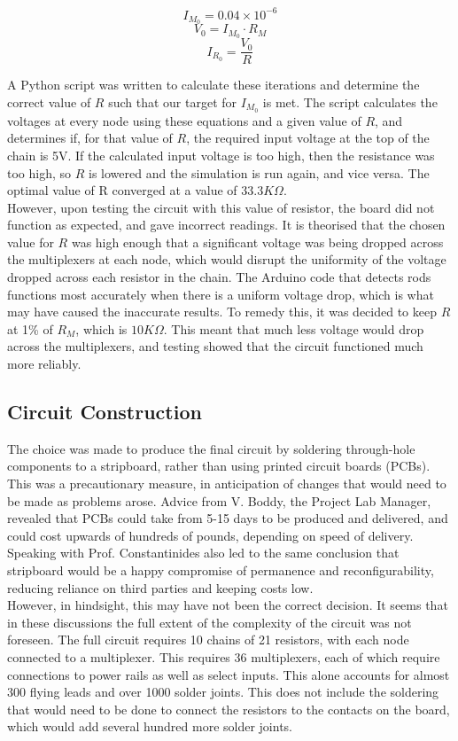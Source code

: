 $$ I_{M_0} = 0.04 \times 10^{-6}$$
$$ V_0 =  I_{M_0} \cdot R_M $$
$$ I_{R_0} = \frac{V_0}{R}$$

A Python script was written to calculate these iterations and determine the correct value of $R$ such that our target for  $I_{M_0}$ is met. The script calculates the voltages at every node using these equations and a given value of $R$, and determines if, for that value of $R$, the required input voltage at the top of the chain is 5V. If the calculated input voltage is too high, then the resistance was too high, so $R$ is lowered and the simulation is run again, and vice versa. The optimal value of R converged at a value of $33.3K\Omega$. \\

However, upon testing the circuit with this value of resistor, the board did not function as expected, and gave incorrect readings. It is theorised that the chosen value for $R$ was high enough that a significant voltage was being dropped across the multiplexers at each node, which would disrupt the uniformity of the voltage dropped across each resistor in the chain. The Arduino code that detects rods functions most accurately when there is a uniform voltage drop, which is what may have caused the inaccurate results. To remedy this, it was decided to keep $R$ at 1\% of $R_M$, which is $10K\Omega$. This meant that much less voltage would drop across the multiplexers, and testing showed that the circuit functioned much more reliably.\\

\subsection{Circuit Construction}

The choice was made to produce the final circuit by soldering through-hole components to a stripboard, rather than using printed circuit boards (PCBs). This was a precautionary measure, in anticipation of changes that would need to be made as problems arose. Advice from V. Boddy, the Project Lab Manager, revealed that PCBs could take from 5-15 days to be produced and delivered, and could cost upwards of hundreds of pounds, depending on speed of delivery. Speaking with Prof. Constantinides also led to the same conclusion that stripboard would be a happy compromise of permanence and reconfigurability, reducing reliance on third parties and keeping costs low.\\

However, in hindsight, this may have not been the correct decision. It seems that in these discussions the full extent of the complexity of the circuit was not foreseen. The full circuit requires 10 chains of 21 resistors, with each node connected to a multiplexer. This requires 36 multiplexers, each of which require connections to power rails as well as select inputs. This alone accounts for almost 300 flying leads and over 1000 solder joints. This does not include the soldering that would need to be done to connect the resistors to the contacts on the board, which would add several hundred more solder joints. \\

